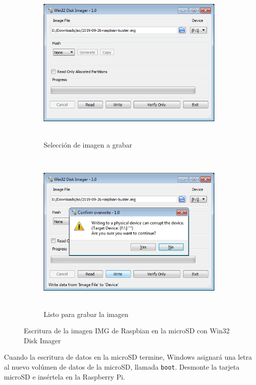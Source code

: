 \documentclass[letterpaper,10.5pt]{article}
\begin{document}
\begin{figure}[H]
	\centering%
	\begin{subfigure}[b]{0.5\linewidth}
		\centering
		\includegraphics[width=0.9\linewidth,height=8cm,keepaspectratio]{img/p01-02-windows-imagea.png} %
		\caption{Selección de imagen a grabar}
		\label{fig:write-image-windows-a} %
	\end{subfigure}%
	\begin{subfigure}[b]{0.5\linewidth}
		\centering
		\includegraphics[width=0.9\linewidth,height=8cm,keepaspectratio]{img/p01-02-windows-imageb.png} %
		\caption{Listo para grabar la imagen}
		\label{fig:write-image-windows-b} %
	\end{subfigure}
	\caption{Escritura de la imagen IMG de Raspbian en la microSD con Win32 Disk Imager}%
	\label{fig:write-image-windows} %
\end{figure}

Cuando la escritura de datos en la microSD termine, Windows asignará una letra al nuevo volúmen de datos de la microSD, llamada \texttt{boot}.
Desmonte la tarjeta microSD e insértela en la Raspberry Pi.
\end{document}

